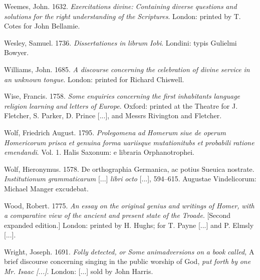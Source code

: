 \documentclass[output=paper]{langsci/langscibook}
\begin{document}
Weemes, John. 1632. \textit{Exercitations} \textit{divine:} \textit{Containing} \textit{diverse} \textit{questions} \textit{and} \textit{solutions} \textit{for} \textit{the} \textit{right} \textit{understanding} \textit{of} \textit{the} \textit{Scriptures}. London: printed by T. Cotes for John Bellamie.

Wesley, Samuel. 1736. \textit{Dissertationes} \textit{in} \textit{librum} \textit{Iobi}. Londini: typis Gulielmi Bowyer.

Williams, John. 1685. \textit{A} \textit{discourse} \textit{concerning} \textit{the} \textit{celebration} \textit{of} \textit{divine} \textit{service} \textit{in} \textit{an} \textit{unknown} \textit{tongue}. London: printed for Richard Chiswell.

Wise, Francis. 1758. \textit{Some} \textit{enquiries} \textit{concerning} \textit{the} \textit{first} \textit{inhabitants} \textit{language} \textit{religion} \textit{learning} \textit{and} \textit{letters} \textit{of} \textit{Europe}. Oxford: printed at the Theatre for J. Fletcher, S. Parker, D. Prince [...], and Messrs Rivington and Fletcher.

Wolf, Friedrich August. 1795. \textit{Prolegomena} \textit{ad} \textit{Homerum} \textit{siue} \textit{de} \textit{operum} \textit{Homericorum} \textit{prisca} \textit{et} \textit{genuina} \textit{forma} \textit{uariisque} \textit{mutationitubs} \textit{et} \textit{probabili} \textit{ratione} \textit{emendandi}. Vol. 1. Halis Saxonum: e libraria Orphanotrophei.

Wolf, Hieronymus. 1578. De orthographia Germanica, ac potius Sueuica nostrate. \textit{Institutionum} \textit{grammaticarum} [...] \textit{libri} \textit{octo} [...], 594–615. Augustae Vindelicorum: Michael Manger excudebat.

Wood, Robert. 1775. \textit{An} \textit{essay} \textit{on} \textit{the} \textit{original} \textit{genius} \textit{and} \textit{writings} \textit{of} \textit{Homer,} \textit{with} \textit{a} \textit{comparative} \textit{view} \textit{of} \textit{the} \textit{ancient} \textit{and} \textit{present} \textit{state} \textit{of} \textit{the} \textit{Troade}. [Second expanded edition.] London: printed by H. Hughs; for T. Payne [...] and P. Elmsly [...].

Wright, Joseph. 1691. \textit{Folly} \textit{detected,} \textit{or} \textit{Some} \textit{animadversions} \textit{on} \textit{a} \textit{book} \textit{called,} A brief discourse concerning singing in the public worship of God, \textit{put} \textit{forth} \textit{by} \textit{one} \textit{Mr.} \textit{Isaac} \textit{\citealt{Marlow1690} [...]}. London: [...] sold by John Harris.
\end{document}
